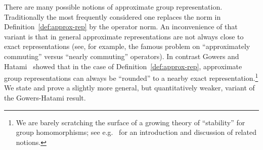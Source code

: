 There are many possible notions of approximate group representation. Traditionally the most frequently considered one replaces the norm in Definition~\ref{def:approx-rep} by the operator norm. An inconvenience of that variant is that in general approximate representations are not always close to exact representations (see, for example, the famous problem on ``approximately commuting'' versus ``nearly commuting'' operators). In contrast 
Gowers and Hatami~\cite{gowers2017inverse} showed that in the case of Definition~\ref{def:approx-rep}, approximate group representations can always be ``rounded'' to a nearby exact representation.\footnote{We are barely scratching the surface of a growing theory of ``stability'' for group homomorphisms; see e.g.~\cite{becker2020stability} for an introduction and discussion of related notions.} 
We state and prove a slightly more general, but quantitatively weaker, variant of the Gowers-Hatami result.




